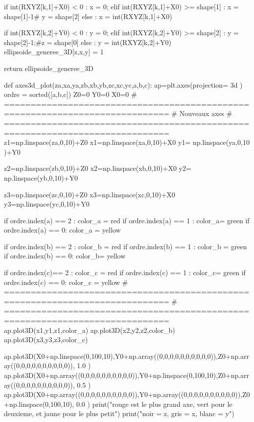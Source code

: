 \begin{customFrame}
        if int(RXYZ[k,1]+X0) < 0 : x = 0;
        elif int(RXYZ[k,1]+X0) >= shape[1] : x = shape[1]-1# y = shape[2]
        else : x = int(RXYZ[k,1]+X0)
        
        if int(RXYZ[k,2]+Y0) < 0 : y = 0;
        elif int(RXYZ[k,2]+Y0) >= shape[2] : y = shape[2]-1;#z = shape[0]
        else : y = int(RXYZ[k,2]+Y0)           
        ellipsoide_generee_3D[z,x,y] = 1   
           
    return ellipsoide_generee_3D


def axes3d_plot(za,xa,ya,zb,xb,yb,zc,xc,yc,a,b,c):
    ap=plt.axes(projection= 3d )    
    ordre = sorted([a,b,c])   
    Z0=0
    Y0=0
    X0=0
    # =============================================================================
    # Nouveaux axes
    # =============================================================================
    z1=np.linspace(za,0,10)+Z0
    x1=np.linspace(xa,0,10)+X0
    y1= np.linspace(ya,0,10 )+Y0
    
    z2=np.linspace(zb,0,10)+Z0
    x2=np.linspace(xb,0,10)+X0
    y2= np.linspace(yb,0,10)+Y0
    
    z3=np.linspace(zc,0,10)+Z0
    x3=np.linspace(xc,0,10)+X0
    y3=np.linspace(yc,0,10)+Y0

    if ordre.index(a) == 2 :
        color_a =  red 
    if ordre.index(a) == 1 :
        color_a=  green 
    if ordre.index(a) == 0:
        color_a =  yellow 
        
    if ordre.index(b) == 2 :
        color_b =  red 
    if ordre.index(b) == 1 :
        color_b =  green 
    if ordre.index(b) == 0:
        color_b=  yellow 
        
    if ordre.index(c)== 2 :
        color_c =  red 
    if ordre.index(c) == 1 :
        color_c=  green 
    if ordre.index(c) == 0:
        color_c =  yellow 
    # =============================================================================
    # =============================================================================   
    ap.plot3D(x1,y1,z1,color_a)
    ap.plot3D(x2,y2,z2,color_b)
    ap.plot3D(x3,y3,z3,color_c)
    
    ap.plot3D(X0+np.linspace(0,100,10),Y0+np.array((0,0,0,0,0,0,0,0,0,0)),Z0+np.array((0,0,0,0,0,0,0,0,0,0)), 1.0 )
    ap.plot3D(X0+np.array((0,0,0,0,0,0,0,0,0,0)),Y0+np.linspace(0,100,10),Z0+np.array((0,0,0,0,0,0,0,0,0,0)), 0.5 )
    ap.plot3D(X0+np.array((0,0,0,0,0,0,0,0,0,0)),Y0+np.array((0,0,0,0,0,0,0,0,0,0)),Z0+np.linspace(0,100,10), 0.0 )    
    print("rouge est le plus grand axe, vert pour le deuxieme, et jaune pour le plus petit")
    print("noir = z, gris = x, blanc = y")


\end{customFrame}
